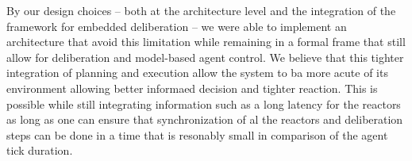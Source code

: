 By our design choices -- both at the architecture level and the
integration of the \eu framework for embedded deliberation -- we
were able to implement an architecture that avoid this limitation
while remaining in a formal frame that still allow for deliberation
and model-based agent control. We believe that this tighter
integration of planning and execution allow the system to ba more
acute of its environment allowing better informaed decision and
tighter reaction. This is possible while still integrating information
such as a long latency for the reactors as long as one can ensure that
synchronization of al the reactors and deliberation steps can be done
in a time that is resonably small in comparison of the agent tick
duration.








